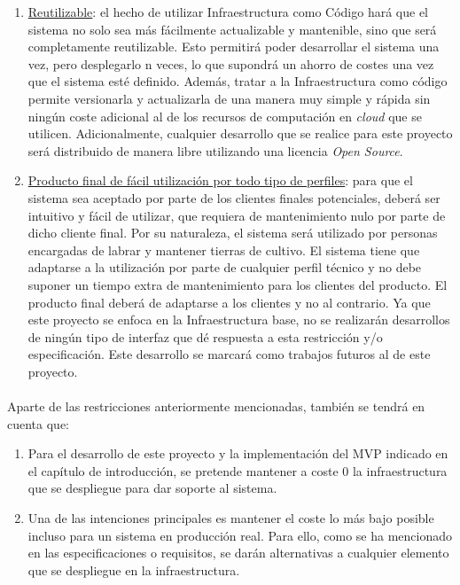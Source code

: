 \documentclass[../../memoria.tex]{subfiles}
\begin{document}
\begin{enumerate}
  \item \uline{Reutilizable}: el hecho de utilizar Infraestructura como Código hará que el sistema no solo sea más fácilmente actualizable y mantenible, sino que será completamente reutilizable. Esto permitirá poder desarrollar el sistema una vez, pero desplegarlo n veces, lo que supondrá un ahorro de costes una vez que el sistema esté definido. Además, tratar a la Infraestructura como código permite versionarla y actualizarla de una manera muy simple y rápida sin ningún coste adicional al de los recursos de computación en \textit{cloud} que se utilicen. Adicionalmente, cualquier desarrollo que se realice para este proyecto será distribuido de manera libre utilizando una licencia \textit{Open Source}.

  \item \uline{Producto final de fácil utilización por todo tipo de perfiles}: para que el sistema sea aceptado por parte de los clientes finales potenciales, deberá ser intuitivo y fácil de utilizar, que requiera de mantenimiento nulo por parte de dicho cliente final. Por su naturaleza, el sistema será utilizado por personas encargadas de labrar y mantener tierras de cultivo. El sistema tiene que adaptarse a la utilización por parte de cualquier perfil técnico y no debe suponer un tiempo extra de mantenimiento para los clientes del producto. El producto final deberá de adaptarse a los clientes y no al contrario. Ya que este proyecto se enfoca en la Infraestructura base, no se realizarán desarrollos de ningún tipo de interfaz que dé respuesta a esta restricción y/o especificación. Este desarrollo se marcará como trabajos futuros al de este proyecto.

\end{enumerate}

\paragraph{}
Aparte de las restricciones anteriormente mencionadas, también se tendrá en cuenta que:

\begin{enumerate}
  \item Para el desarrollo de este proyecto y la implementación del MVP indicado en el capítulo de introducción, se pretende mantener a coste 0 la infraestructura que se despliegue para dar soporte al sistema.

  \item Una de las intenciones principales es mantener el coste lo más bajo posible incluso para un sistema en producción real. Para ello, como se ha mencionado en las especificaciones o requisitos, se darán alternativas a cualquier elemento que se despliegue en la infraestructura.
\end{enumerate}
\end{document}
